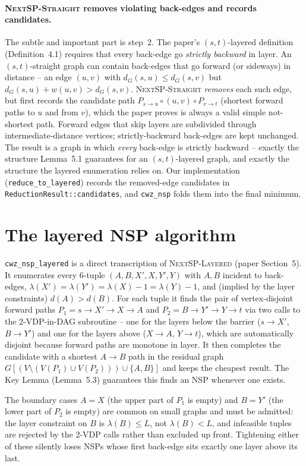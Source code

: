 \paragraph{\textsc{NextSP-Straight} removes violating back-edges and
records candidates.} The subtle and important part is step~2. The
paper's $(s,t)$-layered definition (Definition~4.1) requires that every
back-edge go \emph{strictly backward} in layer. An $(s,t)$-straight
graph can contain back-edges that go forward (or sideways) in distance
-- an edge $(u,v)$ with $d_G(s,u)\le d_G(s,v)$ but
$d_G(s,u)+w(u,v)>d_G(s,v)$. \textsc{NextSP-Straight} \emph{removes} each
such edge, but first records the candidate path
$P_{s\to u}\circ(u,v)\circ P_{v\to t}$ (shortest forward paths to $u$
and from $v$), which the paper proves is always a valid simple
not-shortest path. Forward edges that skip layers are subdivided through
intermediate-distance vertices; strictly-backward back-edges are kept
unchanged. The result is a graph in which \emph{every} back-edge is
strictly backward -- exactly the structure Lemma~5.1 guarantees for an
$(s,t)$-layered graph, and exactly the structure the layered enumeration
relies on. Our implementation (\texttt{reduce\_to\_layered}) records the
removed-edge candidates in \texttt{ReductionResult::candidates}, and
\texttt{cwz\_nsp} folds them into the final minimum.

\section{The layered NSP algorithm}
\label{sec:layered}

\texttt{cwz\_nsp\_layered} is a direct transcription of
\textsc{NextSP-Layered} (paper Section~5). It enumerates every
$6$-tuple $(A,B,X',X,Y',Y)$ with $A,B$ incident to back-edges,
$\lambda(X')=\lambda(Y')=\lambda(X)-1=\lambda(Y)-1$, and (implied by the
layer constraints) $d(A)>d(B)$. For each tuple it finds the pair of
vertex-disjoint forward paths $P_1=s\to X'\to X\to A$ and
$P_2=B\to Y'\to Y\to t$ via two calls to the 2-VDP-in-DAG subroutine --
one for the layers below the barrier ($s\to X'$, $B\to Y'$) and one for
the layers above ($X\to A$, $Y\to t$), which are automatically disjoint
because forward paths are monotone in layer. It then completes the
candidate with a shortest $A\to B$ path in the residual graph
$G[(V\setminus(V(P_1)\cup V(P_2)))\cup\{A,B\}]$ and keeps the cheapest
result. The Key Lemma (Lemma~5.3) guarantees this finds an NSP whenever
one exists.

The boundary cases $A=X$ (the upper part of $P_1$ is empty) and $B=Y'$
(the lower part of $P_2$ is empty) are common on small graphs and must
be admitted: the layer constraint on $B$ is $\lambda(B)\le L$, not
$\lambda(B)<L$, and infeasible tuples are rejected by the 2-VDP calls
rather than excluded up front. Tightening either of these silently loses
NSPs whose first back-edge sits exactly one layer above its last.

